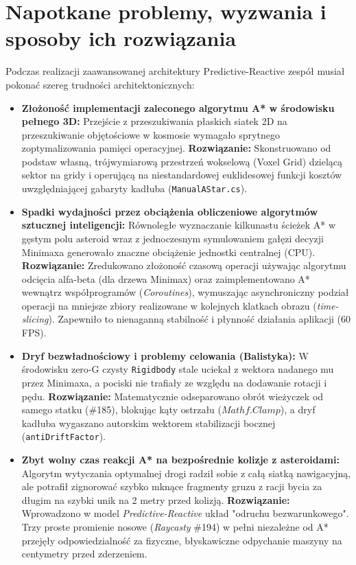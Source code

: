 \documentclass[12pt, a4paper]{article}
\begin{document}
\section{Napotkane problemy, wyzwania i sposoby ich rozwiązania}
Podczas realizacji zaawansowanej architektury Predictive-Reactive zespół musiał pokonać szereg trudności architektonicznych:
\begin{itemize}
    \item \textbf{Złożoność implementacji zaleconego algorytmu A* w środowisku pełnego 3D:} Przejście z przeszukiwania płaskich siatek 2D na przeszukiwanie objętościowe w kosmosie wymagało sprytnego zoptymalizowania pamięci operacyjnej. \textbf{Rozwiązanie:} Skonstruowano od podstaw własną, trójwymiarową przestrzeń wokselową (Voxel Grid) dzielącą sektor na gridy i operującą na niestandardowej euklidesowej funkcji kosztów uwzględniającej gabaryty kadłuba (\texttt{ManualAStar.cs}).
    \item \textbf{Spadki wydajności przez obciążenia obliczeniowe algorytmów sztucznej inteligencji:} Równoległe wyznaczanie kilkunastu ścieżek A* w gęstym polu asteroid wraz z jednoczesnym symulowaniem gałęzi decyzji Minimaxa generowało znaczne obciążenie jednostki centralnej (CPU). \textbf{Rozwiązanie:} Zredukowano złożoność czasową operacji używając algorytmu odcięcia alfa-beta (dla drzewa Minimax) oraz zaimplementowano A* wewnątrz współprogramów (\textit{Coroutines}), wymuszając asynchroniczny podział operacji na mniejsze zbiory realizowane w kolejnych klatkach obrazu (\textit{time-slicing}). Zapewniło to nienaganną stabilność i płynność działania aplikacji (60 FPS).
    \item \textbf{Dryf bezwładnościowy i problemy celowania (Balistyka):} W środowisku zero-G czysty \texttt{Rigidbody} stale uciekał z wektora nadanego mu przez Minimaxa, a pociski nie trafiały ze względu na dodawanie rotacji i pędu. \textbf{Rozwiązanie:} Matematycznie odseparowano obrót wieżyczek od samego statku (\#185), blokując kąty ostrzału ($Mathf.Clamp$), a dryf kadłuba wygaszano autorskim wektorem stabilizacji bocznej (\texttt{antiDriftFactor}).
    \item \textbf{Zbyt wolny czas reakcji A* na bezpośrednie kolizje z asteroidami:} Algorytm wytyczania optymalnej drogi radził sobie z całą siatką nawigacyjną, ale potrafił zignorować szybko mknące fragmenty gruzu z racji bycia za długim na szybki unik na 2 metry przed kolizją. \textbf{Rozwiązanie:} Wprowadzono w model \textit{Predictive-Reactive} układ "odruchu bezwarunkowego". Trzy proste promienie nosowe (\textit{Raycasty} \#194) w pełni niezależne od A* przejęły odpowiedzialność za fizyczne, błyskawiczne odpychanie maszyny na centymetry przed zderzeniem.

\end{itemize}
\end{document}
